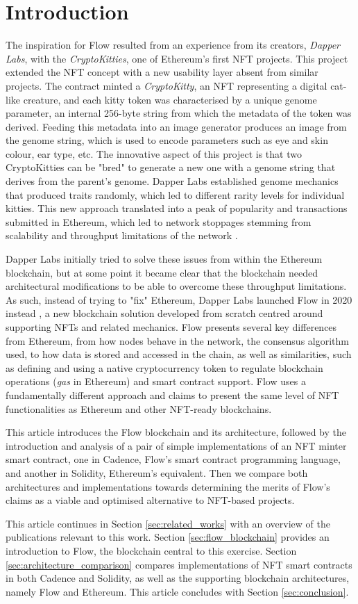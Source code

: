 \documentclass[../NFTComp_IEEE.tex]{subfiles}
\begin{document}
\section{Introduction}
\label{sec:introduction}
The inspiration for Flow resulted from an experience from its creators, \textit{Dapper Labs}, with the \textit{CryptoKitties}, one of Ethereum's first NFT projects. This project extended the NFT concept with a new usability layer absent from similar projects. The contract minted a \textit{CryptoKitty}, an NFT representing a digital cat-like creature, and each kitty token was characterised by a unique genome parameter, an internal 256-byte string from which the metadata of the token was derived. Feeding this metadata into an image generator produces an image from the genome string, which is used to encode parameters such as eye and skin colour, ear type, etc. The innovative aspect of this project is that two CryptoKitties can be "bred" to generate a new one with a genome string that derives from the parent's genome. Dapper Labs established genome mechanics that produced traits randomly, which led to different rarity levels for individual kitties. This new approach translated into a peak of popularity and transactions submitted in Ethereum, which led to network stoppages stemming from scalability and throughput limitations of the network \cite{bbc2017}.
\par
Dapper Labs initially tried to solve these issues from within the Ethereum blockchain, but at some point it became clear that the blockchain needed architectural modifications to be able to overcome these throughput limitations. As such, instead of trying to "fix" Ethereum, Dapper Labs launched Flow in 2020 instead \cite{Gharegozlou2019}, a new blockchain solution developed from scratch centred around supporting NFTs and related mechanics. Flow presents several key differences from Ethereum, from how nodes behave in the network, the consensus algorithm used, to how data is stored and accessed in the chain, as well as similarities, such as defining and using a native cryptocurrency token to regulate blockchain operations (\textit{gas} in Ethereum) and smart contract support. Flow uses a fundamentally different approach and claims to present the same level of NFT functionalities as Ethereum and other NFT-ready blockchains.
\par
This article introduces the Flow blockchain and its architecture, followed by the introduction and analysis of a pair of simple implementations of an NFT minter smart contract, one in Cadence, Flow's smart contract programming language, and another in Solidity, Ethereum's equivalent. Then we compare both architectures and implementations towards determining the merits of Flow's claims as a viable and optimised alternative to NFT-based projects.
\par
This article continues in Section \ref{sec:related_works} with an overview of the publications relevant to this work. Section \ref{sec:flow_blockchain} provides an introduction to Flow, the blockchain central to this exercise. Section \ref{sec:architecture_comparison} compares implementations of NFT smart contracts in both Cadence and Solidity, as well as the supporting blockchain architectures, namely Flow and Ethereum. This article concludes with Section \ref{sec:conclusion}.
\end{document}
